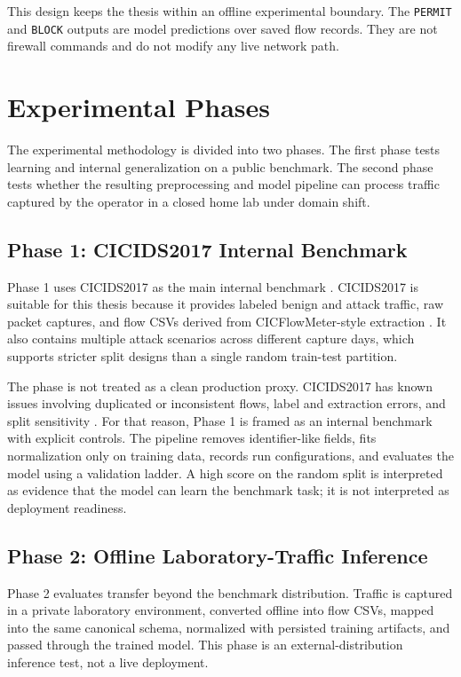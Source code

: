 This design keeps the thesis within an offline experimental boundary. The \texttt{PERMIT} and \texttt{BLOCK} outputs are model predictions over saved flow records. They are not firewall commands and do not modify any live network path.

\section{Experimental Phases}
The experimental methodology is divided into two phases. The first phase tests learning and internal generalization on a public benchmark. The second phase tests whether the resulting preprocessing and model pipeline can process traffic captured by the operator in a closed home lab under domain shift.

\subsection{Phase 1: CICIDS2017 Internal Benchmark}
Phase 1 uses CICIDS2017 as the main internal benchmark \parencite{Sharafaldin2018CICIDS2017,CICIDS2017Web}. CICIDS2017 is suitable for this thesis because it provides labeled benign and attack traffic, raw packet captures, and flow CSVs derived from CICFlowMeter-style extraction \parencite{Lashkari2017CICFlowMeter}. It also contains multiple attack scenarios across different capture days, which supports stricter split designs than a single random train-test partition.

The phase is not treated as a clean production proxy. CICIDS2017 has known issues involving duplicated or inconsistent flows, label and extraction errors, and split sensitivity \parencite{Engelen2021CICIDSIssues,Lanvin2023Errors,Liu2022ErrorPrevalenceNIDS}. For that reason, Phase 1 is framed as an internal benchmark with explicit controls. The pipeline removes identifier-like fields, fits normalization only on training data, records run configurations, and evaluates the model using a validation ladder. A high score on the random split is interpreted as evidence that the model can learn the benchmark task; it is not interpreted as deployment readiness.

\subsection{Phase 2: Offline Laboratory-Traffic Inference}
Phase 2 evaluates transfer beyond the benchmark distribution. Traffic is captured in a private laboratory environment, converted offline into flow CSVs, mapped into the same canonical schema, normalized with persisted training artifacts, and passed through the trained model. This phase is an external-distribution inference test, not a live deployment.

